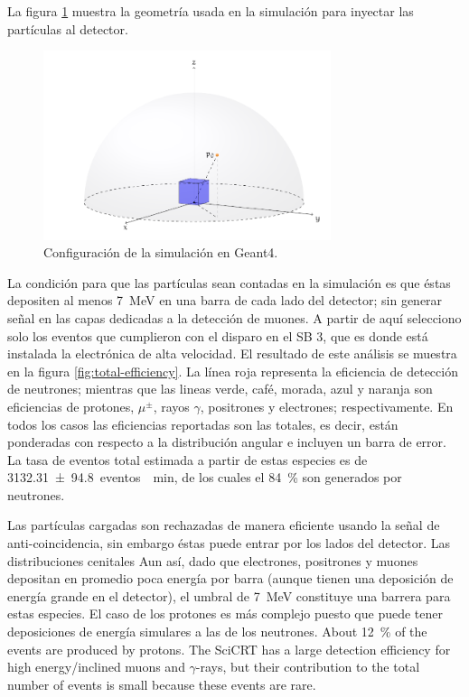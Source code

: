 La figura \ref{fig:sim-setup} muestra la geometría usada en la simulación para inyectar las partículas al detector.

\begin{figure}
        \centering
        \includegraphics[width=0.75\textwidth]{sim-setup.pdf}
        \caption{Configuración de la simulación en Geant4.}
        \label{fig:sim-setup}
\end{figure}

La condición para que las partículas sean contadas en la simulación es que éstas depositen al menos \SI{7}{\mega\electronvolt} en una barra de cada lado del detector; sin generar señal en las capas dedicadas a la detección de muones. A partir de aquí selecciono solo los eventos que cumplieron con el disparo en el SB \num{3}, que es donde está instalada la electrónica de alta velocidad. El resultado de este análisis se muestra en la figura \ref{fig:total-efficiency}. La línea roja representa la eficiencia de detección de neutrones; mientras que las lineas verde, café, morada, azul y naranja son eficiencias de protones, $\mu^{\pm}$, rayos $\gamma$, positrones y electrones; respectivamente. En todos los casos las eficiencias reportadas son las totales, es decir, están ponderadas con respecto a la distribución angular e incluyen un barra de error. La tasa de eventos total estimada a partir de estas especies es de \SI{3132.31(9480)}{eventos  \per\minute}, de los cuales el \SI{84}{\percent} son generados por neutrones.

Las partículas cargadas son rechazadas de manera eficiente usando la señal de anti-coincidencia, sin embargo éstas puede entrar por los lados del detector. Las distribuciones cenitales  Aun así, dado que electrones, positrones y muones depositan en promedio poca energía por barra (aunque tienen una deposición de energía grande en el detector), el umbral de \SI{7}{\mega\electronvolt} constituye una barrera para estas especies. El caso de los protones es más complejo
puesto que puede tener deposiciones de energía simulares a las de los neutrones.  About \SI{12}{\percent} of the events are produced by protons. The SciCRT has a large detection efficiency for high energy/inclined muons and $\gamma$-rays, but their contribution to the total number of events is small because these events are rare.

